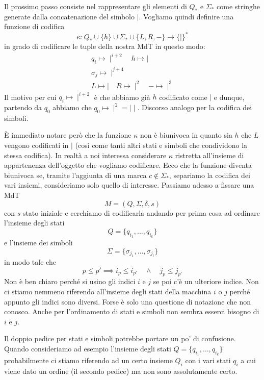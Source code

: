 Il prossimo passo consiste nel rappresentare gli elementi di
$Q_*$ e $\Sigma_*$ come stringhe generate dalla concatenazione
del simbolo $\mid$. Vogliamo quindi definire una funzione di
codifica
\[
	\kappa : Q_* \cup \{ h \} \cup \Sigma_* \cup \{ L, R, - \}
	\rightarrow \{ \mid \}^*
\]
in grado di codificare le tuple della nostra MdT in questo modo:
\begin{gather*}
	q_i \mapsto \mid^{i+2}      \quad h \mapsto \mid \\
	\sigma_j \mapsto \mid^{j+4} \\
	L \mapsto \mid \quad R \mapsto \mid^2 \quad - \mapsto \mid^3
\end{gather*}
Il motivo per cui $q_i \mapsto \mid^{i+2}$ è che abbiamo già $h$
codificato come $\mid$ e dunque, partendo da $q_0$ abbiamo che
$q_0 \mapsto \mid^2 = \mid \mid$. Discorso analogo per la
codifica dei simboli.

\`E immediato notare però che la funzione $\kappa$ non è
biunivoca in quanto sia $h$ che $L$ vengono codificati in $\mid$
(così come tanti altri stati e simboli che condividono la stessa
codifica). In realtà a noi interessa considerare $\kappa$
ristretta all'insieme di appartenenza dell'oggetto che vogliamo
codificare. Ecco che la funzione diventa biunivoca se, tramite
l'aggiunta di una marca $c \notin \Sigma_*$, separiamo la
codifica dei vari insiemi, consideriamo solo quello di interesse.
Passiamo adesso a fissare una MdT
\[ M = (Q, \Sigma, \delta, s) \]
con $s$ stato iniziale e cerchiamo di codificarla andando per
prima cosa ad ordinare l'insieme degli stati
\[ Q = \{ q_{i_1}, \dots, q_{i_k} \} \]
e l'insieme dei simboli
\[ \Sigma = \{ \sigma_{j_1}, \dots, \sigma_{j_l} \} \]
in modo tale che
\[
	p \leq p' \implies i_p \leq i_{p'} \quad
	\land \quad j_p \leq j_{p'}
\]
Non è ben chiaro perché si usino gli indici $i$ e $j$ se poi c'è
un ulteriore indice. Non ci stiamo nemmeno riferendo all'insieme
degli stati della macchina $i$ o $j$ perché appunto gli indici
sono diversi. Forse è solo una questione di notazione che non
conosco. Anche per l'ordinamento di stati e simboli non sembra
esserci bisogno di $i$ e $j$.

Il doppio pedice per stati e simboli potrebbe portare un po' di
confusione. Quando consideriamo ad esempio l'insieme degli stati
$Q = \{ q_{i_1}, \dots, q_{i_k} \}$ probabilmente ci stiamo
riferendo ad un certo insieme $Q_i$ con i vari stati $q_i$ a cui
viene dato un ordine (il secondo pedice) ma non sono
assolutamente certo.

